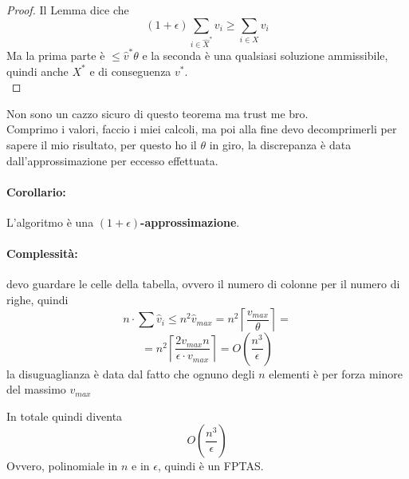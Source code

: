 \documentclass[11pt]{article}
\begin{document}
	\begin{proof}
		Il Lemma dice che
		$$ (1 + \epsilon) \sum_{i \in \hat X^\ast} v_i \geq \sum_{i \in X} v_i $$
		Ma la prima parte è $\leq \hat v^\ast \theta$ e la seconda è una qualsiasi soluzione ammissibile, quindi anche $X^\ast$ e di conseguenza $v^\ast$.\\
	\end{proof}
	
	Non sono un cazzo sicuro di questo teorema ma trust me bro.\\
	
	Comprimo i valori, faccio i miei calcoli, ma poi alla fine devo decomprimerli per sapere il mio risultato, per questo ho il $\theta$ in giro, la discrepanza è data dall'approssimazione per eccesso effettuata.\\
	
	\paragraph{Corollario:} L'algoritmo è una \textbf{$(1 + \epsilon)$-approssimazione}.\\
	
	\paragraph{Complessità:} devo guardare le celle della tabella, ovvero il numero di colonne per il numero di righe, quindi 
	$$ n \cdot \sum \hat v_i \leq n^2 \hat v_{max} = n^2 \left\lceil \frac{v_{max}}{\theta} \right\rceil = $$
	$$ = n^2 \left\lceil \frac{2 v_{max} n}{\epsilon \cdot v_{max}} \right\rceil = O\left(\frac{n^3}{\epsilon}\right) $$
	la disuguaglianza è data dal fatto che ognuno degli $n$ elementi è per forza minore del massimo $v_{max}$
	
	In totale quindi diventa
	$$ O \left(\frac{n^3}{\epsilon}\right)$$
	Ovvero, polinomiale in $n$ e in $\epsilon$, quindi è un FPTAS.\\
	
	
	
	
\end{document}
